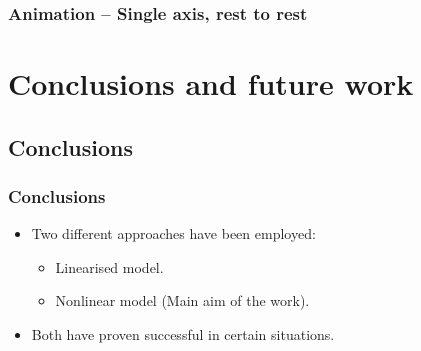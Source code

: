 \documentclass{beamer}
\begin{document}
\begin{center}
	\begin{frame} \frametitle{Animation -- Single axis, rest to rest}
	\end{frame}
\end{center}


\section{Conclusions and future work}
\begin{frame}
	\sectionpage
\end{frame}

\subsection{Conclusions}
\begin{frame} \frametitle{Conclusions}
	\begin{itemize}
		\item<2-> Two different approaches have been employed:
		\begin{itemize}
			\item<3-> Linearised model.
			\item<4-> Nonlinear model (Main aim of the work).
		\end{itemize}
		\item<5-> Both have proven successful in certain situations.
	\end{itemize}
\end{frame}
\end{document}

